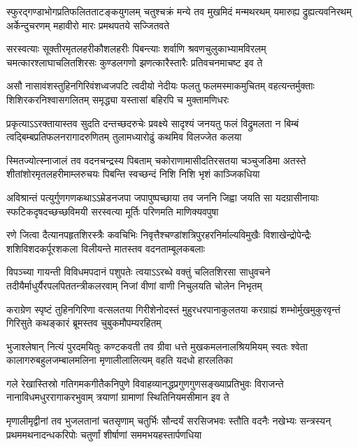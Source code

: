 \fourlineindentedshloka
{स्फुरद्गण्डाभोगप्रतिफलितताटङ्कयुगलम्}
{चतुश्चक्रं मन्ये तव मुखमिदं मन्मथरथम्}
{यमारुह्य द्रुह्यत्यवनिरथम् अर्केन्दुचरणम्}
{महावीरो मारः प्रमथपतये सज्जितवते}%

\fourlineindentedshloka
{सरस्वत्याः सूक्तीरमृतलहरीकौशलहरीः}
{पिबन्त्याः शर्वाणि श्रवणचुलुकाभ्यामविरलम्}
{चमत्कारश्लाघाचलितशिरसः कुण्डलगणो}
{झणत्कारैस्तारैः प्रतिवचनमाचष्ट इव ते}%

\fourlineindentedshloka
{असौ नासावंशस्तुहिनगिरिवंशध्वजपटि}
{त्वदीयो नेदीयः फलतु फलमस्माकमुचितम्}
{वहत्यन्तर्मुक्ताः शिशिरकरनिश्वासगलितम्}
{समृद्ध्या यस्तासां बहिरपि च मुक्तामणिधरः}%

\fourlineindentedshloka
{प्रकृत्याऽऽरक्तायास्तव सुदति दन्तच्छदरुचेः}
{प्रवक्ष्ये सादृश्यं जनयतु फलं विद्रुमलता}
{न बिम्बं त्वद्बिम्बप्रतिफलनरागादरुणितम्}
{तुलामध्यारोढुं कथमिव विलज्जेत कलया}%

\fourlineindentedshloka
{स्मितज्योत्स्नाजालं तव वदनचन्द्रस्य पिबताम्}
{चकोराणामासीदतिरसतया चञ्चुजडिमा}
{अतस्ते शीतांशोरमृतलहरीमाम्लरुचयः}
{पिबन्ति स्वच्छन्दं निशि निशि भृशं काञ्जिकधिया}%

\fourlineindentedshloka
{अविश्रान्तं पत्युर्गुणगणकथाऽऽम्रेडनजपा}
{जपापुष्पच्छाया तव जननि जिह्वा जयति सा}
{यदग्रासीनायाः स्फटिकदृषदच्छच्छविमयी}
{सरस्वत्या मूर्तिः परिणमति माणिक्यवपुषा}%

\fourlineindentedshloka
{रणे जित्वा दैत्यानपहृतशिरस्त्रैः कवचिभिः}
{निवृत्तैश्चण्डांशत्रिपुरहरनिर्माल्यविमुखैः}
{विशाखेन्द्रोपेन्द्रैः शशिविशदकर्पूरशकला}
{विलीयन्ते मातस्तव वदनताम्बूलकबलाः}%

\fourlineindentedshloka
{विपञ्च्या गायन्ती विविधमपदानं पशुपतेः}
{त्वयाऽऽरब्धे वक्तुं चलितशिरसा साधुवचने}
{तदीयैर्माधुर्यैरपलपिततन्त्रीकलरवाम्}
{निजां वीणां वाणी निचुलयति चोलेन निभृतम्}%

\fourlineindentedshloka
{कराग्रेण स्पृष्टं तुहिनगिरिणा वत्सलतया}
{गिरीशेनोदस्तं मुहुरधरपानाकुलतया}
{करग्राह्यं शम्भोर्मुखमुकुरवृन्तं गिरिसुते}
{कथङ्कारं ब्रूमस्तव चुबुकमौपम्यरहितम्}%

\fourlineindentedshloka
{भुजाश्लेषान् नित्यं पुरदमयितुः कण्टकवती}
{तव ग्रीवा धत्ते मुखकमलनालश्रियमियम्}
{स्वतः श्वेता कालागरुबहुलजम्बालमलिना}
{मृणालीलालित्यम् वहति यदधो हारलतिका}%

\fourlineindentedshloka
{गले रेखास्तिस्रो गतिगमकगीतैकनिपुणे}
{विवाहव्यानद्धप्रगुणगुणसङ्ख्याप्रतिभुवः}
{विराजन्ते नानाविधमधुररागाकरभुवाम्}
{त्रयाणां ग्रामाणां स्थितिनियमसीमान इव ते}%

\fourlineindentedshloka
{मृणालीमृद्वीनां तव भुजलतानां चतसृणाम्}
{चतुर्भिः सौन्दर्यं सरसिजभवः स्तौति वदनैः}
{नखेभ्यः सन्त्रस्यन् प्रथममथनादन्धकरिपोः}
{चतुर्णां शीर्षाणां सममभयहस्तार्पणधिया}%

